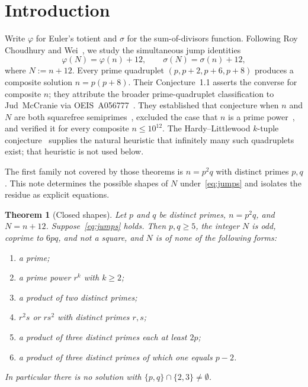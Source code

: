 \documentclass[11pt,reqno]{amsart}
\newcommand{\ph}{\varphi}
\newcommand{\sig}{\sigma}
\newtheorem{theorem}{Theorem}
\theoremstyle{definition}
\begin{document}
\section{Introduction}

Write \(\ph\) for Euler's totient and \(\sig\) for the sum-of-divisors function.
Following Roy Choudhury and Wei~\cite{RCW2026}, we study the simultaneous jump identities
\begin{equation}
\label{eq:jumps}
\ph(N)=\ph(n)+12,\qquad \sig(N)=\sig(n)+12,
\end{equation}
where \(N:=n+12\). Every prime quadruplet \((p,p+2,p+6,p+8)\) produces a composite solution \(n=p(p+8)\).
Their Conjecture~1.1 asserts the converse for composite \(n\); they attribute the broader prime-quadruplet classification to Jud~McCranie via OEIS~A056777~\cite{RCW2026}. They established that conjecture when \(n\) and \(N\)
are both squarefree semiprimes~\cite[Thm.~2.2]{RCW2026}, excluded the case that \(n\) is a prime power~\cite[Thm.~3.1]{RCW2026},
and verified it for every composite \(n\le 10^{12}\). The Hardy--Littlewood \(k\)-tuple conjecture~\cite{HL1923} supplies the
natural heuristic that infinitely many such quadruplets exist; that heuristic is not used below.

The first family not covered by those theorems is \(n=p^2q\) with distinct primes \(p,q\). This note determines the possible
shapes of \(N\) under~\eqref{eq:jumps} and isolates the residue as explicit equations.

\begin{theorem}[Closed shapes]
\label{thm:closed}
Let \(p\) and \(q\) be distinct primes, \(n=p^2q\), and \(N=n+12\).
Suppose~\eqref{eq:jumps} holds. Then \(p,q\ge 5\), the integer \(N\) is odd, coprime to \(6pq\), and not a square, and \(N\) is of none of the following forms:
\begin{enumerate}
\item a prime;
\item a prime power \(r^k\) with \(k\ge 2\);
\item a product of two distinct primes;
\item \(r^2s\) or \(rs^2\) with distinct primes \(r,s\);
\item a product of three distinct primes each at least \(2p\);
\item a product of three distinct primes of which one equals \(p-2\).
\end{enumerate}
In particular there is no solution with \(\{p,q\}\cap\{2,3\}\ne\emptyset\).
\end{theorem}
\end{document}
